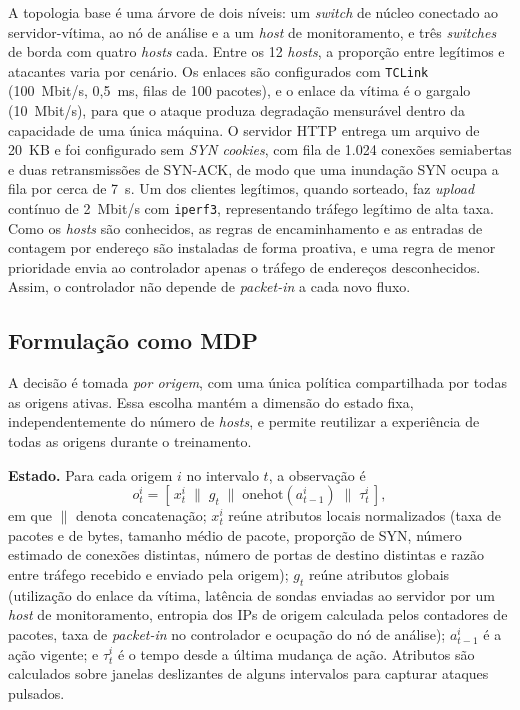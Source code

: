 \documentclass[12pt]{article}
\begin{document}
A topologia base é uma árvore de dois níveis: um \textit{switch} de núcleo
conectado ao servidor-vítima, ao nó de análise e a um \textit{host} de
monitoramento, e três \textit{switches} de borda com quatro \textit{hosts}
cada. Entre os 12 \textit{hosts}, a proporção
entre legítimos e atacantes varia por cenário. Os enlaces são configurados com
\texttt{TCLink} (100~Mbit/s, 0{,}5~ms, filas de 100 pacotes), e o enlace da
vítima é o gargalo (10~Mbit/s), para que o ataque produza degradação
mensurável dentro da capacidade de uma única máquina. O servidor HTTP entrega
um arquivo de 20~KB e foi configurado sem \textit{SYN cookies}, com fila de
1.024 conexões semiabertas e duas retransmissões de SYN-ACK, de modo que uma
inundação SYN ocupa a fila por cerca de 7~s. Um dos clientes legítimos, quando
sorteado, faz \textit{upload} contínuo de 2~Mbit/s com \texttt{iperf3},
representando tráfego legítimo de alta taxa. Como os \textit{hosts} são conhecidos, as regras de
encaminhamento e as entradas de contagem por endereço são instaladas de forma
proativa, e uma regra de menor prioridade envia ao controlador apenas o
tráfego de endereços desconhecidos. Assim, o controlador não depende de
\textit{packet-in} a cada novo fluxo.

\subsection{Formulação como MDP}

A decisão é tomada \emph{por origem}, com uma única política compartilhada por
todas as origens ativas. Essa escolha mantém a dimensão do estado fixa,
independentemente do número de \textit{hosts}, e permite reutilizar a
experiência de todas as origens durante o treinamento.

\textbf{Estado.} Para cada origem $i$ no intervalo $t$, a observação é
\begin{equation}
  o_t^i = \left[\, x_t^i \;\|\; g_t \;\|\; \mathrm{onehot}(a_{t-1}^i) \;\|\; \tau_t^i \,\right],
\end{equation}
em que $\|$ denota concatenação; $x_t^i$ reúne atributos locais normalizados (taxa de pacotes e de bytes,
tamanho médio de pacote, proporção de SYN, número estimado de conexões
distintas, número de portas de destino distintas e razão entre tráfego recebido e enviado pela
origem); $g_t$ reúne atributos globais (utilização do enlace da vítima,
latência de sondas enviadas ao servidor por um \textit{host} de monitoramento,
entropia dos IPs de origem calculada pelos contadores de pacotes, taxa de
\textit{packet-in} no controlador e ocupação do nó de análise);
$a_{t-1}^i$ é a ação vigente; e $\tau_t^i$ é o tempo desde a última mudança de
ação. Atributos são calculados sobre janelas deslizantes de alguns intervalos
para capturar ataques pulsados.
\end{document}
